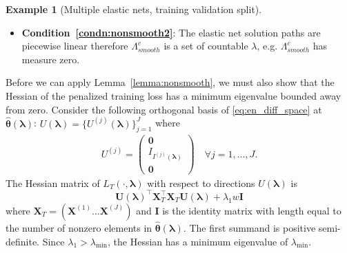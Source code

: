\documentclass[12pt]{article} %
\theoremstyle{definition}
\newtheorem{example}{Example}
\begin{document}
\begin{example}[Multiple elastic nets, training validation split]
\begin{itemize}
		\item[] \textbf{Condition~\ref{condn:nonsmooth2}}: The elastic net solution paths are piecewise linear \citep{zou2003regression} therefore $\Lambda_{smooth}^c$ is a set of countable $\lambda$, e.g. $\Lambda_{smooth}^c$ has measure zero.
	\end{itemize}
	Before we can apply Lemma~\ref{lemma:nonsmooth}, we must also show that the Hessian of the penalized training loss has a minimum eigenvalue bounded away from zero.
	Consider the following orthogonal basis of \eqref{eq:en_diff_space} at $\hat{\boldsymbol{\theta}}(\boldsymbol{\lambda})$: $U(\boldsymbol{\lambda}) = \{U^{(j)}(\boldsymbol{\lambda})\}_{j = 1}^J$ where
	\begin{align}
	U^{(j)} =
	\left(
	\begin{matrix}
	\boldsymbol{0} \\
	I_{I^{(j)}(\boldsymbol \lambda)}\\
	\boldsymbol{0}
	\end{matrix}
	\right)
	\quad \forall j = 1,...,J.
	\end{align}
	The Hessian matrix of $L_T(\cdot, \boldsymbol{\lambda})$ with respect to directions $U(\boldsymbol{\lambda})$ is
	$$
	\boldsymbol U(\boldsymbol{\lambda})^\top \boldsymbol{X}_{T}^\top \boldsymbol{X}_{T} \boldsymbol U(\boldsymbol{\lambda}) + \lambda_1 w \boldsymbol{I}
	$$
	where $\boldsymbol{X}_{T} = (\boldsymbol{X}^{(1)} ... \boldsymbol{X}^{(J)})$
	and $\boldsymbol{I}$ is the identity matrix with length equal to the number of nonzero elements in $\hat{\boldsymbol{\theta}}(\boldsymbol{\lambda})$.
	The first summand is positive semi-definite.
	Since $\lambda_1 > \lambda_{\min}$, the Hessian has a minimum eigenvalue of $\lambda_{\min}$.
	

\end{example}
\end{document}
